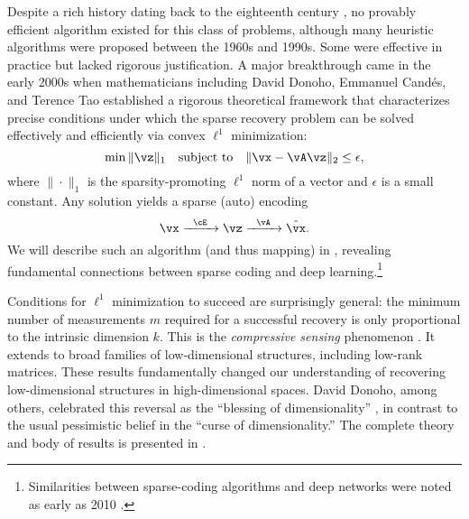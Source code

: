 \documentclass[../../book-main.tex]{subfiles}
\begin{document}
Despite a rich history dating back to the eighteenth century \cite{Boscovichca1750}, no provably efficient algorithm existed for this class of problems, although many heuristic algorithms were proposed between the 1960s and 1990s. Some were effective in practice but lacked rigorous justification. A major breakthrough came in the early 2000s when mathematicians including David Donoho, Emmanuel Cand\'{e}s, and Terence Tao \cite{donoho2005neighborly,Candes2005,CandesE2005-IT} established a rigorous theoretical framework that characterizes precise conditions under which the sparse recovery problem can be solved effectively and efficiently via convex \(\ell^{1}\) minimization:
\begin{equation}
    \min \|\vz\|_{1} \quad \text{subject to} \quad \|\vx - \vA\vz\|_{2} \leq \epsilon,
\end{equation}
where \(\|\cdot\|_{1}\) is the sparsity-promoting \(\ell^{1}\) norm of a vector and \(\epsilon\) is a small constant. Any solution yields a sparse (auto) encoding 
\begin{equation}
    \vx \xrightarrow{\hspace{2mm} \cE \hspace{2mm}} \vz \xrightarrow{\hspace{2mm} \vA \hspace{2mm}} \hat{\vx}.
    \label{eqn:decoding-sparse}
\end{equation}
We will describe such an algorithm (and thus mapping) in , revealing fundamental connections between sparse coding and deep learning.\footnote{Similarities between sparse-coding algorithms and deep networks were noted as early as 2010 \cite{gregor2010learning}.}

Conditions for \(\ell^{1}\) minimization to succeed are surprisingly general: the minimum number of measurements \(m\) required for a successful recovery is only proportional to the intrinsic dimension \(k\). This is the \textit{compressive sensing} phenomenon \cite{CandesE2006-ICM}. It extends to broad families of low-dimensional structures, including low-rank matrices. These results fundamentally changed our understanding of recovering low-dimensional structures in high-dimensional spaces. David Donoho, among others, celebrated this reversal as the ``blessing of dimensionality'' \cite{DonohoD2000}, in contrast to the usual pessimistic belief in the ``curse of dimensionality.'' The complete theory and body of results is presented in \cite{Wright-Ma-2022}.
\end{document}

